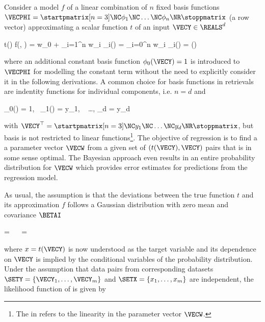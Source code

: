     Consider a model $f$ of a linear combination of $n$ fixed basis functions
    $\VECPHI = \startpmatrix[n=3] \NC \phi_1 \NC \dots \NC \phi_n \NR
    \stoppmatrix$ (a row vector) approximating a scalar
    function $t$ of an input $\VECY \in \REALS^d$

    \startformula
        t(\VECY) \approx f(\VECY, \VECW) = w_0 + \sum_{i=1}^n w_i \phi_i(\VECY)
            = \sum_{i=0}^n w_i \phi_i(\VECY) = \VECPHI(\VECY) \VECW
    \stopformula

    where an additional constant basis function $\phi_0(\VECY) = 1$ is
    introduced to $\VECPHI$ for modelling the constant term without the need to
    explicitly consider it in the following derivations. A common choice for
    basis functions in retrievals are indentity functions for individual
    components, i.e. $n = d$ and

    \startformula
        \phi_0(\VECY) = 1,~ \phi_1(\VECY) = y_1, ~ \dots, \phi_d = y_d
    \stopformula

    with $\VECY^\top = \startpmatrix[n=3] \NC y_1 \NC \dots \NC y_d \NR \stoppmatrix$,
    but basis is not restricted to linear functions\footnote{The 
    in  refers to the linearity in the parameter
    vector $\VECW$.}. The objective of regression is to find a
    a parameter vector $\VECW$ from a given set of $(t(\VECY), \VECY)$ pairs
    that is in some sense optimal. The Bayesian approach even results in
    an entire probability distribution for $\VECW$ which provides error
    estimates for predictions from the regression model.

    As usual, the assumption is that the deviations between the true function
    $t$ and its approximation $f$ follows a Gaussian distribution with zero
    mean and covariance $\BETAI$

    \placeformula
    \startformula
    \startalign[n=3,align={left,right,left}]
        \NC \NC {} = \NC
                 \NR
        \NC \Rightarrow~~ \NC {} = \NC
             \EQCOMMA {}
    \stopalign
    \stopformula

    where $x = t(\VECY)$ is now understood as the target variable and its
    dependence on $\VECY$ is implied by the conditional variables of the
    probability distribution. Under the assumption that data pairs from
    corresponding datasets $\SETY = \{ \VECY_1, \dots, \VECY_m \}$ and $\SETX
    = \{ x_1, \dots, x_m \}$ are independent, the likelihood function of
    is given by

